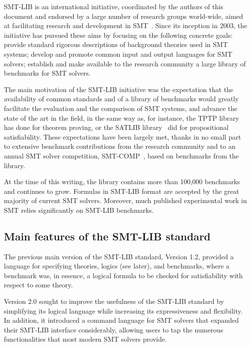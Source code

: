 
SMT-LIB is an international initiative,
coordinated by the authors of this document and 
endorsed by a large number of research groups world-wide,
aimed at facilitating research and development in SMT~\cite{SMT-LIB}.
Since its inception in 2003, the initiative has pursued these aims
by focusing on the following concrete goals:
provide standard rigorous descriptions of background theories used in SMT systems;
develop and promote common input and output languages for SMT solvers;
establish and make available to the research community a large library of
benchmarks for SMT solvers. 

The main motivation of the SMT-LIB initiative was the expectation that 
the availability of common standards and of a library of benchmarks would 
greatly facilitate the evaluation and the comparison of SMT systems,
and advance the state of the art in the field,
in the same way as, for instance,
the TPTP library~\cite{Sut-JAR-09} has done for theorem proving,
or the SATLIB library~\cite{HooStu-SAT-00} did 
for propositional satisfiability.
These expectations have been largely met, 
thanks in no small part 
to extensive benchmark contributions from the research community and
to an annual SMT solver competition, SMT-COMP~\cite{BardMS-CAV-05},
based on benchmarks from the library.

At the time of this writing, 
the library contains more than 100,000 benchmarks and continues to grow.
Formulas in SMT-LIB format are accepted by the great majority 
of current SMT solvers.
Moreover, much published experimental work in SMT relies significantly 
on SMT-LIB benchmarks.


\subsection{Main features of the SMT-LIB standard}

The previous main version of the SMT-LIB standard, Version 1.2, 
provided a language for specifying theories, logics (see later), and benchmarks,
where a benchmark was, in essence, a logical formula to be checked for 
satisfiability with respect to some theory.

Version 2.0 sought to improve the usefulness of the SMT-LIB standard
by simplifying its logical language 
while increasing its expressiveness and flexibility.
In addition, 
it introduced a command language for SMT solvers that 
expanded their SMT-LIB interface considerably,
allowing users to tap the numerous functionalities 
that most modern SMT solvers provide.

